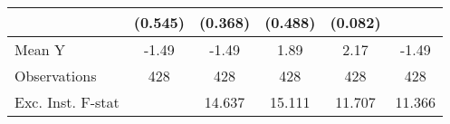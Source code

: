 {\begin{tabular}{l*{5}{c}}
            &     (0.545)         &     (0.368)         &     (0.488)         &     (0.082)         &                     \\
\midrule
Mean Y      &       -1.49         &       -1.49         &        1.89         &        2.17         &       -1.49         \\
Observations&         428         &         428         &         428         &         428         &         428         \\
Exc. Inst. F-stat&                     &      14.637         &      15.111         &      11.707         &      11.366         \\
\bottomrule
\end{tabular}
}
